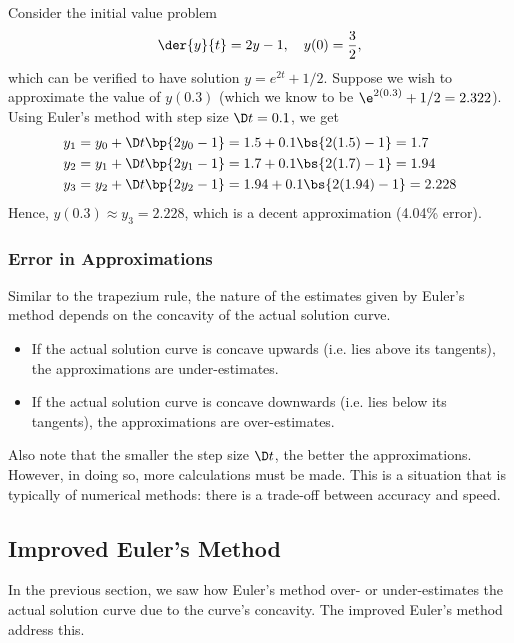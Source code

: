 \begin{example}\label{eg:Eulers-Method}
    Consider the initial value problem \[\der{y}{t} = 2y - 1, \quad y(0) = \frac32,\] which can be verified to have solution $y = e^{2t} + 1/2$. Suppose we wish to approximate the value of $y(0.3)$ (which we know to be $\e^{2(0.3)} + 1/2 = 2.322$). Using Euler's method with step size $\D t = 0.1$, we get
    \begin{align*}
        y_1 &= y_0 + \D t \bp{2y_0 - 1} = 1.5 + 0.1 \bs{2(1.5) - 1} = 1.7\\
        y_2 &= y_1 + \D t \bp{2y_1 - 1} = 1.7 + 0.1 \bs{2(1.7) - 1} = 1.94\\
        y_3 &= y_2 + \D t \bp{2y_2 - 1} = 1.94 + 0.1 \bs{2(1.94) - 1} = 2.228
    \end{align*}
    Hence, $y(0.3) \approx y_3 = 2.228$, which is a decent approximation (4.04\% error).
\end{example}

\subsubsection{Error in Approximations}

Similar to the trapezium rule, the nature of the estimates given by Euler's method depends on the concavity of the actual solution curve.
\begin{itemize}
    \item If the actual solution curve is concave upwards (i.e. lies above its tangents), the approximations are under-estimates.
    \item If the actual solution curve is concave downwards (i.e. lies below its tangents), the approximations are over-estimates.
\end{itemize}

Also note that the smaller the step size $\D t$, the better the approximations. However, in doing so, more calculations must be made. This is a situation that is typically of numerical methods: there is a trade-off between accuracy and speed.

\subsection{Improved Euler's Method}

In the previous section, we saw how Euler's method over- or under-estimates the actual solution curve due to the curve's concavity. The improved Euler's method address this.


